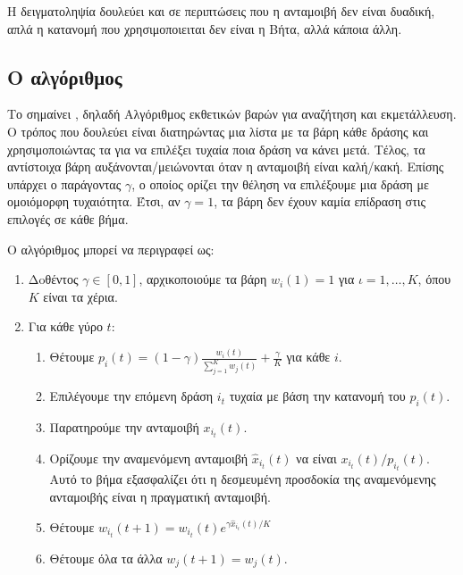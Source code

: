 Η δειγματοληψία  δουλεύει και σε περιπτώσεις που η ανταμοιβή δεν είναι δυαδική, απλά η κατανομή που χρησιμοποιειται δεν είναι η Βήτα, αλλά κάποια άλλη.

\subsection{Ο αλγόριθμος }

Το  σημαίνει , δηλαδή Αλγόριθμος εκθετικών βαρών για αναζήτηση και εκμετάλλευση. Ο τρόπος που δουλεύει είναι διατηρώντας μια λίστα με τα βάρη κάθε δράσης και χρησιμοποιώντας τα για να επιλέξει τυχαία ποια δράση να κάνει μετά. Τέλος, τα αντίστοιχα βάρη αυξάνονται/μειώνονται όταν η ανταμοιβή είναι καλή/κακή. Επίσης υπάρχει ο παράγοντας $γ$, ο οποίος ορίζει την θέληση να επιλέξουμε μια δράση με ομοιόμορφη τυχαιότητα. Έτσι, αν $γ=1$, τα βάρη δεν έχουν καμία επίδραση στις επιλογές σε κάθε βήμα.

Ο αλγόριθμος μπορεί να περιγραφεί ως:
\begin{enumerate}
    \item Δoθέντος $γ \in [0,1]$, αρχικοποιούμε τα βάρη $w_i(1)=1$ για $ι = 1,\ldots,K$, όπου $K$ είναι τα χέρια.
    \item Για κάθε γύρο $t$:
          \begin{enumerate}
              \item Θέτουμε $p_i(t) = (1-γ)\frac{w_i(t)}{\sum_{j=1}^K w_j(t)} + \frac{γ}{K}$ για κάθε $i$.
              \item Επιλέγουμε την επόμενη δράση $i_t$ τυχαία με βάση την κατανομή του $p_i(t)$.
              \item Παρατηρούμε την ανταμοιβή $x_{i_t}(t)$.
              \item Ορίζουμε την αναμενόμενη ανταμοιβή $\hat{x}_{i_t}(t)$ να είναι $x_{i_t}(t)/p_{i_t}(t)$. Αυτό το βήμα εξασφαλίζει ότι η δεσμευμένη προσδοκία της αναμενόμενης ανταμοιβής είναι η πραγματική ανταμοιβή.
              \item Θέτουμε $w_{i_t}(t+1) = w_{i_t}(t)e^{γ\hat{x}_{i_t}(t)/K}$
              \item Θέτουμε όλα τα άλλα $w_j(t+1) = w_j(t)$.
          \end{enumerate}
\end{enumerate}

